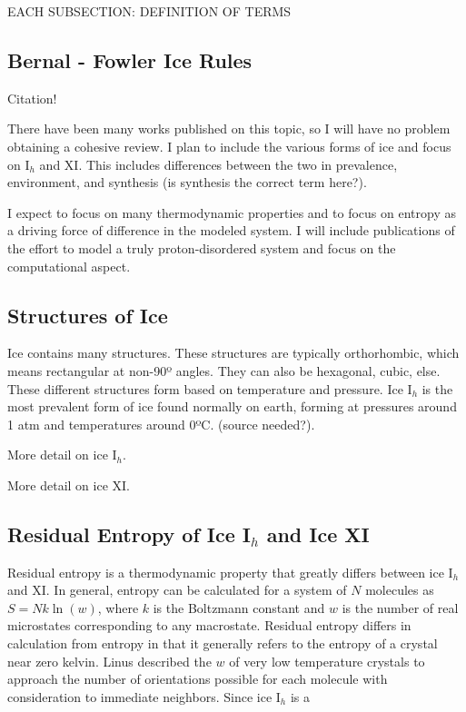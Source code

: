 EACH SUBSECTION: DEFINITION OF TERMS

\subsection{Bernal - Fowler Ice Rules}

Citation! \cite{BFIceOG}

There have been many works published on this topic, so I will have no problem obtaining a cohesive review. I plan to include the various forms of ice and focus on I$_{h}$ and XI. This includes differences between the two in prevalence, environment, and synthesis (is synthesis the correct term here?). 

I expect to focus on many thermodynamic properties and to focus on entropy as a driving force of difference in the modeled system. I will include publications of the effort to model a truly proton-disordered system and focus on the computational aspect. 

\subsection{Structures of Ice}

Ice contains many structures.
These structures are typically orthorhombic, which means rectangular at non-90º angles.
They can also be hexagonal, cubic, else. 
These different structures form based on temperature and pressure. 
Ice I$_{h}$ is the most prevalent form of ice found normally on earth, forming at pressures around 1 atm and temperatures around 0ºC. (source needed?).

More detail on ice I$_{h}$.

More detail on ice XI.

\subsection{Residual Entropy of Ice I$_{h}$ and Ice XI}

Residual entropy is a thermodynamic property that greatly differs between ice I$_{h}$ and XI. 
In general, entropy can be calculated for a system of $N$ molecules as $S = Nk\ln(w)$, where $k$ is the Boltzmann constant and $w$ is the number of real microstates corresponding to any macrostate.
Residual entropy differs in calculation from entropy in that it generally refers to the entropy of a crystal near zero kelvin. 
Linus \cite{PaulingIce} described the $w$ of very low temperature crystals to approach the number of orientations possible for each molecule with consideration to immediate neighbors. 
Since ice I$_{h}$ is a 

